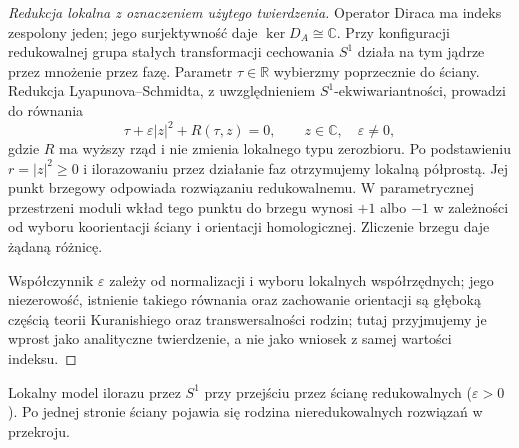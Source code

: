 \begin{proof}[Redukcja lokalna z oznaczeniem użytego twierdzenia]
Operator Diraca ma indeks zespolony jeden; jego
surjektywność daje $\ker D_A\cong\mathbb C$.
Przy konfiguracji redukowalnej grupa stałych
transformacji cechowania $S^1$ działa na tym jądrze
przez mnożenie przez fazę. Parametr $\tau\in\mathbb R$
wybierzmy poprzecznie do ściany. Redukcja
Lyapunova--Schmidta, z uwzględnieniem
$S^1$-ekwiwariantności, prowadzi do równania
\[
\tau+\varepsilon|z|^2+R(\tau,z)=0,
\qquad z\in\mathbb C,\quad\varepsilon\ne0,
\]
gdzie $R$ ma wyższy rząd i nie zmienia lokalnego typu
zerozbioru. Po podstawieniu $r=|z|^2\ge0$ i ilorazowaniu
przez działanie faz otrzymujemy lokalną półprostą.
Jej punkt brzegowy odpowiada rozwiązaniu redukowalnemu.
W parametrycznej przestrzeni moduli wkład tego punktu
do brzegu wynosi $+1$ albo $-1$ w zależności od
wyboru koorientacji ściany i orientacji homologicznej.
Zliczenie brzegu daje żądaną różnicę.

Współczynnik $\varepsilon$ zależy od normalizacji
i wyboru lokalnych współrzędnych; jego niezerowość,
istnienie takiego równania oraz zachowanie orientacji
są głęboką częścią teorii
Kuranishiego oraz transwersalności rodzin; tutaj
przyjmujemy je wprost jako analityczne twierdzenie,
a nie jako wniosek z samej wartości indeksu.
\end{proof}

\begin{center}

{\footnotesize Lokalny model ilorazu przez $S^1$ przy przejściu przez
ścianę redukowalnych ($\varepsilon>0$). Po jednej stronie ściany
pojawia się rodzina nieredukowalnych rozwiązań w przekroju.}
\end{center}

